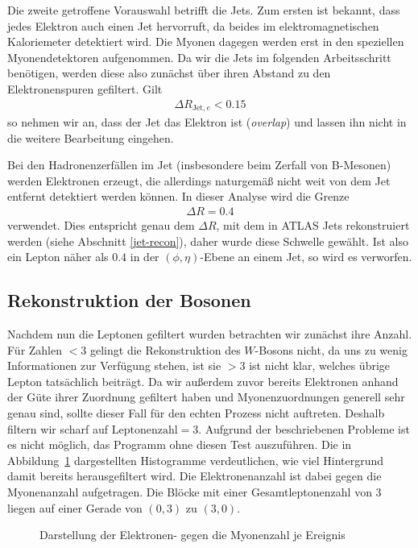 Die zweite getroffene Vorauswahl betrifft die Jets. Zum ersten ist bekannt, dass
jedes Elektron auch einen Jet hervorruft, da beides im elektromagnetischen
Kaloriemeter detektiert wird. Die Myonen dagegen werden erst in den speziellen
Myonendetektoren aufgenommen. Da wir die Jets im folgenden Arbeitsschritt
benötigen, werden diese also zunächst über ihren Abstand zu den Elektronenspuren
gefiltert. Gilt
\begin{align}
  \Delta R_{\text{Jet},e} < 0.15
\end{align}
so nehmen wir an, dass der Jet das Elektron ist (\emph{overlap}) und lassen ihn
nicht in die weitere Bearbeitung eingehen.

Bei den Hadronenzerfällen im Jet (insbesondere beim Zerfall von B-Mesonen)
werden Elektronen erzeugt, die allerdings naturgemäß nicht weit von dem Jet
entfernt detektiert werden können. In dieser Analyse wird die Grenze
\begin{align}
  \Delta R = 0.4
\end{align}
verwendet. Dies entspricht genau dem $\Delta R$, mit dem in ATLAS Jets
rekonstruiert werden (siehe Abschnitt \ref{jet-recon}), daher wurde diese
Schwelle gewählt. Ist also ein Lepton näher als $0.4$ in der $(\phi,
\eta)$-Ebene an einem Jet, so wird es verworfen.

\subsection{Rekonstruktion der Bosonen}
Nachdem nun die Leptonen gefiltert wurden betrachten wir zunächst ihre Anzahl.
Für Zahlen $< 3$ gelingt die Rekonstruktion des $W$-Bosons nicht, da uns zu
wenig Informationen zur Verfügung stehen, ist sie $> 3$ ist nicht klar, welches
übrige Lepton tatsächlich beiträgt. Da wir außerdem zuvor bereits Elektronen
anhand der Güte ihrer Zuordnung gefiltert haben und Myonenzuordnungen generell
sehr genau sind, sollte dieser Fall für den echten Prozess nicht auftreten.
Deshalb filtern wir scharf auf $\text{Leptonenzahl} = 3$. Aufgrund der
beschriebenen Probleme ist es nicht möglich, das Programm ohne diesen Test
auszuführen. Die in Abbildung~\ref{fig:el_mu_n} dargestellten Histogramme verdeutlichen, wie viel
Hintergrund damit bereits herausgefiltert wird. Die Elektronenanzahl ist dabei
gegen die Myonenanzahl aufgetragen. Die Blöcke mit einer Gesamtleptonenzahl von
3 liegen auf einer Gerade von $(0, 3)$ zu $(3,0)$.

\begin{figure}
  
  
  
  
  
  \caption{Darstellung der Elektronen- gegen die Myonenzahl je Ereignis}
  \label{fig:el_mu_n}
\end{figure}

